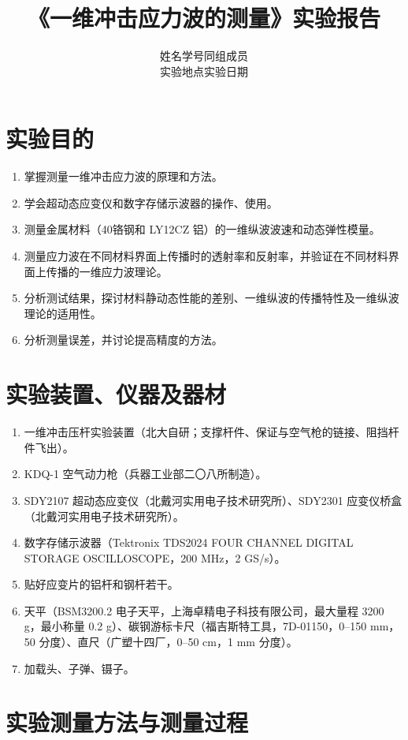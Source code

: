 \documentclass[UTF8,a4paper,12pt]{ctexart}
\title{《一维冲击应力波的测量》实验报告}
\author{姓名\blank[2.5cm] \quad 学号\blank[3cm] \quad 同组成员\blank[4cm]\\[1em]
实验地点\blank[3cm] \quad 实验日期\blank[4cm]}
\date{}
\numberwithin{equation}{section}
\begin{document}
\maketitle
\tableofcontents
\clearpage

\section{实验目的}
\begin{enumerate}
  \item 掌握测量一维冲击应力波的原理和方法。
  \item 学会超动态应变仪和数字存储示波器的操作、使用。
  \item 测量金属材料（40铬钢和 LY12CZ 铝）的一维纵波波速和动态弹性模量。
  \item 测量应力波在不同材料界面上传播时的透射率和反射率，并验证在不同材料界面上传播的一维应力波理论。
  \item 分析测试结果，探讨材料静动态性能的差别、一维纵波的传播特性及一维纵波理论的适用性。
  \item 分析测量误差，并讨论提高精度的方法。
\end{enumerate}

\section{实验装置、仪器及器材}
\begin{enumerate}
  \item 一维冲击压杆实验装置（北大自研；支撑杆件、保证与空气枪的链接、阻挡杆件飞出）。
  \item KDQ-1 空气动力枪（兵器工业部二〇八所制造）。
  \item SDY2107 超动态应变仪（北戴河实用电子技术研究所）、SDY2301 应变仪桥盒（北戴河实用电子技术研究所）。
  \item 数字存储示波器（Tektronix TDS2024 FOUR CHANNEL DIGITAL STORAGE OSCILLOSCOPE，200 MHz，2 GS/s）。
  \item 贴好应变片的铝杆和钢杆若干。
  \item 天平（BSM3200.2 电子天平，上海卓精电子科技有限公司，最大量程 3200 g，最小称量 0.2 g）、碳钢游标卡尺（福吉斯特工具，7D-01150，0--150 mm，50 分度）、直尺（广塑十四厂，0--50 cm，1 mm 分度）。
  \item 加载头、子弹、镊子。
\end{enumerate}

\section{实验测量方法与测量过程}
\end{document}
